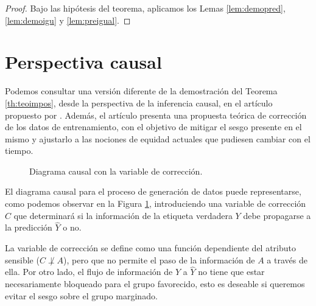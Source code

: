 \documentclass[oneside,openright,titlepage,numbers=noenddot,openany,headinclude,footinclude=true,
cleardoublepage=empty,abstractoff,BCOR=5mm,paper=a4,fontsize=12pt,main=spanish]{scrreprt}
\begin{document}
\begin{proof}
Bajo las hipótesis del teorema, aplicamos los Lemas \ref{lem:demopred}, \ref{lem:demoigu} y \ref{lem:preigual}.
\end{proof}

\section{Perspectiva causal} \label{sec:saravaku}

Podemos consultar una versión diferente de la demostración del Teorema \ref{th:teoimpos}, desde la perspectiva de la inferencia causal, en el artículo propuesto por \cite{impossibilityth2021}. Además, el artículo presenta una propuesta teórica de corrección de los datos de entrenamiento, con el objetivo de mitigar el sesgo presente en el mismo y ajustarlo a las nociones de equidad actuales que pudiesen cambiar con el tiempo.\vspace{7mm}

\begin{figure}[h]
\centering
{}
\caption{Diagrama causal con la variable de corrección.}
\label{fig:varcorrect}
\end{figure}

\clearpage

El diagrama causal para el proceso de generación de datos puede representarse, como podemos observar en la Figura \ref{fig:varcorrect}, introduciendo una variable de corrección $C$ que determinará si la información de la etiqueta verdadera $Y$ debe propagarse a la predicción $\hat{Y}$ o no. 

La variable de corrección se define como una función dependiente del atributo sensible ($C \not\perp A$), pero que no permite el paso de la información de $A$ a través de ella. Por otro lado, el flujo de información de $Y$ a $\hat{Y}$ no tiene que estar necesariamente bloqueado para el grupo favorecido, esto es deseable si queremos evitar el sesgo sobre el grupo marginado.\\
\end{document}
